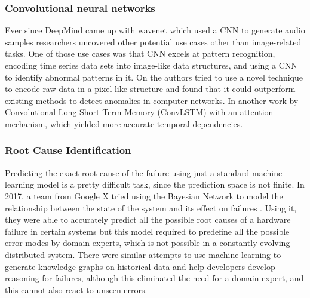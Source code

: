 \subsubsection{Convolutional neural networks}

Ever since DeepMind came up with wavenet which used a CNN to generate audio samples \citep{oord2016wavenet} researchers uncovered other potential use cases other than image-related tasks. One of those use cases was that CNN excels at pattern recognition, encoding time series data sets into image-like data structures, and using a CNN to identify abnormal patterns in it. On \cite{kim2018encoding} the authors tried to use a novel technique to encode raw data in a pixel-like structure and found that it could outperform existing methods to detect anomalies in computer networks. In another work by \cite{zhang2019deep} Convolutional Long-Short-Term Memory (ConvLSTM) with an attention mechanism, which yielded more accurate temporal dependencies. 


\subsubsection{Root Cause Identification}

Predicting the exact root cause of the failure using just a standard machine learning model is a pretty difficult task, since the prediction space is not finite. In 2017, a team from Google X tried using the Bayesian Network to model the relationship between the state of the system and its effect on failures \citep{chigurupati2017root}. Using it, they were able to accurately predict all the possible root causes of a hardware failure in certain systems but this model required to predefine all the possible error modes by domain experts, which is not possible in a constantly evolving distributed system. There were similar attempts \cite{gonzalez2017root} to use machine learning to generate knowledge graphs on historical data and help developers develop reasoning for failures, although this eliminated the need for a domain expert, and this cannot also react to unseen errors.

